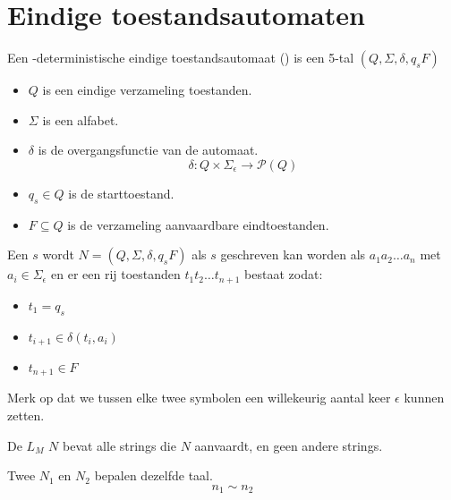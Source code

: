 \documentclass[main.tex]{subfiles}
\begin{document}
\section{Eindige toestandsautomaten}
\label{sec:eind-toest}

\begin{de}
  Een \niet-deterministische eindige toestandsautomaat () is een 5-tal $(Q,\Sigma,\delta,q_{s}F)$
  \begin{itemize}
  \item $Q$ is een eindige verzameling toestanden.
  \item $\Sigma$ is een alfabet.
  \item $\delta$ is de overgangsfunctie van de automaat.
  \[ \delta: Q \times \Sigma_{\epsilon} \rightarrow \mathcal{P}(Q) \]
  \item $q_{s} \in Q$ is de starttoestand.
  \item $F \subseteq Q$ is de verzameling aanvaardbare eindtoestanden.
  \end{itemize}
\end{de}

\begin{de}
  Een  $s$ wordt  $N=(Q,\Sigma,\delta,q_{s}F)$ als $s$ geschreven kan worden als $a_{1}a_{2}\ldots a_{n}$ met $a_{i} \in \Sigma_{\epsilon}$ en er een rij toestanden $t_{1}t_{2}\ldots t_{n+1}$ bestaat zodat:
  \begin{itemize}
  \item $t_{1} = q_{s}$
  \item $t_{i+1} \in \delta(t_{i},a_{i})$
  \item $t_{n+1} \in F$
  \end{itemize}
  Merk op dat we tussen elke twee symbolen een willekeurig aantal keer $\epsilon$ kunnen zetten.
\end{de}

\begin{de}
  De  $L_{M}$  $N$ bevat alle strings die $N$ aanvaardt, en geen andere strings.
\end{de}

\begin{de}
  Twee  $N_{1}$ en $N_{2}$ bepalen dezelfde taal.
  \[ n_{1} \sim n_{2} \]
\end{de}
\end{document}
